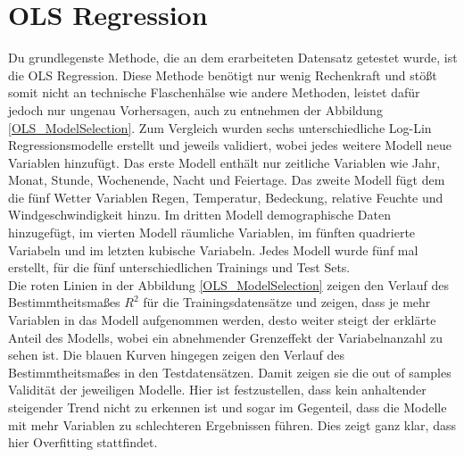 \documentclass[a4paper,12pt]{thesis}
\begin{document}
\section{OLS Regression}

Du grundlegenste Methode, die an dem erarbeiteten Datensatz getestet wurde, ist die OLS Regression. Diese Methode benötigt nur wenig Rechenkraft und stößt somit nicht an technische Flaschenhälse wie andere Methoden, leistet dafür jedoch nur ungenau Vorhersagen, auch zu entnehmen der Abbildung \ref{OLS_ModelSelection}. Zum Vergleich wurden sechs unterschiedliche Log-Lin Regressionsmodelle erstellt und jeweils validiert, wobei jedes weitere Modell neue Variablen hinzufügt. Das erste Modell enthält nur zeitliche Variablen wie Jahr, Monat, Stunde, Wochenende, Nacht und Feiertage. Das zweite Modell fügt dem die fünf Wetter Variablen Regen, Temperatur, Bedeckung, relative Feuchte und Windgeschwindigkeit hinzu. Im dritten Modell demographische Daten hinzugefügt, im vierten Modell räumliche Variablen, im fünften quadrierte Variabeln und im letzten kubische Variabeln. Jedes Modell wurde fünf mal erstellt, für die fünf unterschiedlichen Trainings und Test Sets.\\
Die roten Linien in der Abbildung \ref{OLS_ModelSelection} zeigen den Verlauf des Bestimmtheitsmaßes $R^2$ für die Trainingsdatensätze und zeigen, dass je mehr Variablen in das Modell aufgenommen werden, desto weiter steigt der erklärte Anteil des Modells, wobei ein abnehmender Grenzeffekt der Variabelnanzahl zu sehen ist. Die blauen Kurven hingegen zeigen den Verlauf des Bestimmtheitsmaßes in den Testdatensätzen. Damit zeigen sie die out of samples Validität der jeweiligen Modelle. Hier ist festzustellen, dass kein anhaltender steigender Trend nicht zu erkennen ist und sogar im Gegenteil, dass die Modelle mit mehr Variablen zu schlechteren Ergebnissen führen. Dies zeigt ganz klar, dass hier Overfitting stattfindet.\\
\end{document}
